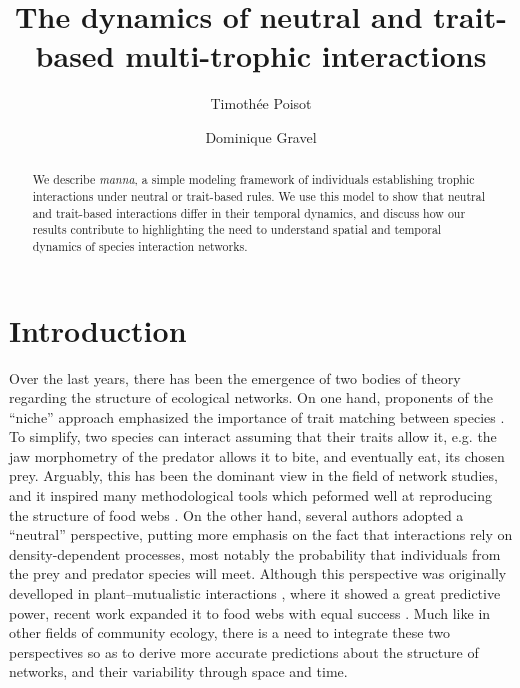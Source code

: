 \documentclass[10pt,twocolumn,fleqn]{article}
\title{The dynamics of neutral and trait-based multi-trophic interactions}
\date{}
\author[1,2]{Timoth\'ee Poisot}
\author[1,2]{Dominique Gravel}
\affil[1]{Universit\'e du Qu\'ebec \`a Rimouski, Rimouski, Canada.}
\affil[2]{Quebec Centre for Biodiversity Science, McGill University, Montr\'eal, Canada.}
\affil[*]{email: \texttt{timothee\_poisot@uqar.ca}}
\begin{document}
\maketitle

\begin{abstract}
We describe \emph{manna}, a simple modeling framework of individuals
establishing trophic interactions under neutral or trait-based rules. We use
this model to show that neutral and trait-based interactions differ in their
temporal dynamics, and discuss how our results contribute to highlighting the
need to understand spatial and temporal dynamics of species interaction
networks.
\end{abstract}

\section{Introduction}

Over the last years, there has been the emergence of two bodies of theory
regarding the structure of ecological networks. On one hand, proponents of the
``niche'' approach emphasized the importance of trait matching between species
\citep{olesen_missing_2011}. To simplify, two species can interact assuming
that their traits allow it, e.g.  the jaw morphometry of the predator allows it
to bite, and eventually eat, its chosen prey. Arguably, this has been the
dominant view in the field of network studies, and it inspired many
methodological tools which peformed well at reproducing the structure of food
webs \citep{williams_simple_2000}. On the other hand, several authors adopted a
``neutral'' perspective, putting more emphasis on the fact that interactions
rely on density-dependent processes, most notably the probability that
individuals from the prey and predator species will meet. Although this
perspective was originally develloped in plant--mutualistic interactions
\citep{bluthgen_measuring_2006}, where it showed a great predictive power,
recent work expanded it to food webs with equal success
\citep{canard_emergence_2012}. Much like in other fields of community ecology,
there is a need to integrate these two perspectives so as to derive more
accurate predictions about the structure of networks, and their variability
through space and time.
\end{document}
